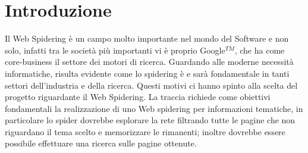 \chapter{Introduzione}
Il Web Spidering è un campo molto importante nel mondo del Software e non solo, infatti tra le società più importanti vi è proprio Google$^{TM}$, che ha come core-business il settore dei motori di ricerca. Guardando alle moderne necessità informatiche, risulta evidente come lo spidering è e sarà fondamentale in tanti settori dell'industria e della ricerca. Questi motivi ci hanno spinto alla scelta del progetto riguardante il Web Spidering. La traccia richiede come obiettivi fondamentali la realizzazione di uno Web spidering per informazioni tematiche, in particolare lo spider dovrebbe esplorare la rete filtrando tutte le pagine che non riguardano il tema scelto e memorizzare le rimanenti; inoltre dovrebbe essere possibile effettuare una ricerca sulle pagine ottenute.